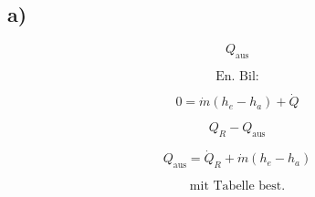 

\subsection*{a)}

\[
Q_{\text{aus}}
\]

\[
\text{En. Bil:}
\]

\[
0 = \dot{m} (h_e - h_a) + \dot{Q}
\]

\[
Q_R - Q_{\text{aus}}
\]

\[
Q_{\text{aus}} = \dot{Q}_R + \dot{m} (h_e - h_a)
\]

\[
\text{mit Tabelle best.}
\]
